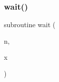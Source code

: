 \mbox{\label{main__comp_8f_a660fa5c3eadf21e849173b15155f0f7f}} 
\subsubsection{\texorpdfstring{wait()}{wait()}}
{\footnotesize\ttfamily subroutine wait (\begin{DoxyParamCaption}\item[{}]{n,  }\item[{}]{x }\end{DoxyParamCaption})}

